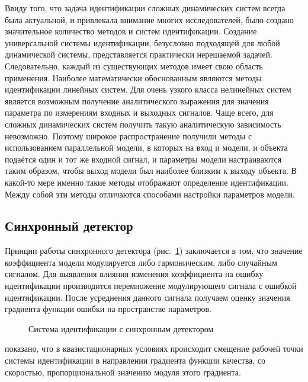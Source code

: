 Ввиду того, что задача идентификации сложных динамических систем всегда была актуальной,
и привлекала внимание многих исследователей, было создано
значительное количество методов и систем идентификации.
Создание универсальной системы идентификации, безусловно подходящей для
любой динамической системы, представляется практически нерешаемой задачей.
Следовательно, каждый из существующих методов имеет свою область применения.
Наиболее математически обоснованным являются методы идентификации
линейных систем.
Для очень узкого класса нелинейных систем является возможным
получение аналитического выражения для значения параметра
по измерениям входных и выходных сигналов. Чаще всего,
для сложных динамических систем получить такую аналитическую
зависимость невозможно. Поэтому широкое распространение получили методы
с использованием параллельной модели, %
в которых на вход и модели, и объекта подаётся один и тот же входной сигнал,
и параметры модели настраиваются таким образом, чтобы выход модели
был наиболее близким к выходу объекта. В какой-то мере
именно такие методы отображают определение идентификации.
Между собой эти методы отличаются способами настройки параметров модели.


\subsection{Синхронный детектор} %

Принцип работы синхронного детектора %
(рис.~\ref{atu:f:syncdet})
заключается в том,
что значение коэффициента модели модулируется либо гармоническим,
либо случайным сигналом. Для выявления влияния
изменения коэффициента на ошибку идентификации
производится перемножение модулирующего сигнала с ошибкой
идентификации. После усреднения данного сигнала
получаем оценку значения градиента функции ошибки на
пространстве параметров.

\begin{figure}[htb!]
\begin{center}

\end{center}
\caption{Система идентификации с синхронным детектором}
\label{atu:f:syncdet}
\end{figure}

показано, что в квазистационарных условиях
происходит смещение рабочей точки системы идентификации
в направлении градиента функции качества,
со скоростью, пропорциональной значению модуля этого градиента.

